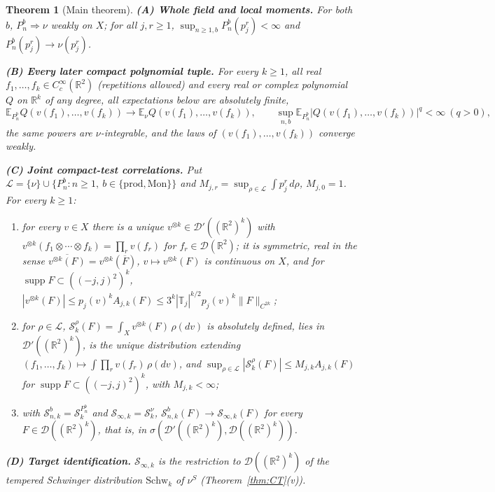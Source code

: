 \documentclass[11pt]{article}
\theoremstyle{plain}
\newtheorem{theorem}{Theorem}[section]
\theoremstyle{definition}
\theoremstyle{remark}
\newcommand{\R}{\mathbb{R}}
\newcommand{\E}{\mathbb{E}}
\newcommand{\T}{\mathbb{T}}
\newcommand{\cD}{\mathcal{D}}
\newcommand{\cL}{\mathcal{L}}
\newcommand{\cS}{\mathcal{S}}
\newcommand{\Schw}{\mathrm{Schw}}
\newcommand{\bprod}{\mathrm{prod}}
\newcommand{\bMon}{\mathrm{Mon}}
\newcommand{\conj}[1]{\overline{#1}}
\DeclareMathOperator{\supp}{supp}
\begin{document}
\begin{theorem}[Main theorem]
\smallskip\noindent\textbf{(A) Whole field and local moments.} For both $b$,
$P^{b}_{n}\Rightarrow\nu$ weakly on $X$; for all $j,r\ge1$,
$\sup_{n\ge1,b}P^{b}_{n}(p_j^{r})<\infty$ and $P^{b}_{n}(p_j^{r})\to\nu(p_j^{r})$.

\smallskip\noindent\textbf{(B) Every later compact polynomial tuple.} For every
$k\ge1$, all real $f_1,\dots,f_k\in C_c^{\infty}(\R^{2})$ (repetitions allowed) and
every real or complex polynomial $Q$ on $\R^{k}$ of any degree, all expectations
below are absolutely finite,
\[
\E_{P^{b}_{n}}Q(v(f_1),\dots,v(f_k))\to\E_{\nu}Q(v(f_1),\dots,v(f_k)),\qquad
\sup_{n,b}\E_{P^{b}_{n}}|Q(v(f_1),\dots,v(f_k))|^{q}<\infty\ (q>0),
\]
the same powers are $\nu$-integrable, and the laws of $(v(f_1),\dots,v(f_k))$
converge weakly.

\smallskip\noindent\textbf{(C) Joint compact-test correlations.} Put
$\cL=\{\nu\}\cup\{P^{b}_{n}:n\ge1,\ b\in\{\bprod,\bMon\}\}$ and
$M_{j,r}=\sup_{\rho\in\cL}\int p_j^{r}\,d\rho$, $M_{j,0}=1$. For every $k\ge1$:
\begin{enumerate}[label=(C\arabic*),leftmargin=3em]
\item for every $v\in X$ there is a unique $v^{\otimes k}\in\cD'((\R^{2})^{k})$
  with $v^{\otimes k}(f_1\otimes\cdots\otimes f_k)=\prod_r v(f_r)$ for
  $f_r\in\cD(\R^{2})$; it is symmetric, real in the sense
  $\conj{v^{\otimes k}(F)}=v^{\otimes k}(\conj F)$, $v\mapsto v^{\otimes k}(F)$ is
  continuous on $X$, and for $\supp F\subset((-j,j)^{2})^{k}$,
  $|v^{\otimes k}(F)|\le p_j(v)^{k}A_{j,k}(F)\le3^{k}|\T_j|^{k/2}p_j(v)^{k}\|F\|_{C^{2k}}$;
\item for $\rho\in\cL$, $\cS^{\rho}_{k}(F)=\int_X v^{\otimes k}(F)\,\rho(dv)$ is
  absolutely defined, lies in $\cD'((\R^{2})^{k})$, is the unique distribution
  extending $(f_1,\dots,f_k)\mapsto\int\prod_r v(f_r)\,\rho(dv)$, and
  $\sup_{\rho\in\cL}|\cS^{\rho}_{k}(F)|\le M_{j,k}A_{j,k}(F)$ for
  $\supp F\subset((-j,j)^{2})^{k}$, with $M_{j,k}<\infty$;
\item with $\cS^{b}_{n,k}=\cS^{P^{b}_{n}}_{k}$ and $\cS_{\infty,k}=\cS^{\nu}_{k}$,
  $\cS^{b}_{n,k}(F)\to\cS_{\infty,k}(F)$ for every $F\in\cD((\R^{2})^{k})$, that
  is, in $\sigma(\cD'((\R^{2})^{k}),\cD((\R^{2})^{k}))$.
\end{enumerate}

\smallskip\noindent\textbf{(D) Target identification.} $\cS_{\infty,k}$ is the
restriction to $\cD((\R^{2})^{k})$ of the tempered Schwinger distribution
$\Schw_k$ of $\nu^{S}$ (Theorem~\ref{thm:CT}(v)).


\end{theorem}
\end{document}
